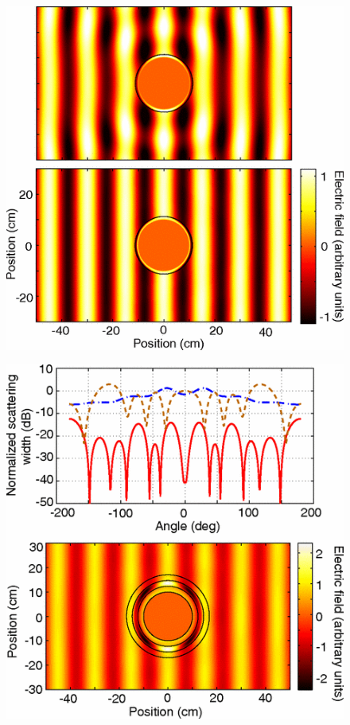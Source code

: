 \documentclass[a4paper, 12pt]{article}
\begin{document}
\begin{figure}[t]
  \centering
  \includegraphics[height=0.4\paperheight, width=0.55\paperwidth]{fig3.png}
  \caption{}
  \label{fig:3}
\end{figure}

\begin{figure}[t]
  \centering
  \includegraphics[height=0.4\paperheight, width=0.55\paperwidth]{fig4.png}
  \caption{}
  \label{fig:4}
\end{figure}
\end{document}
